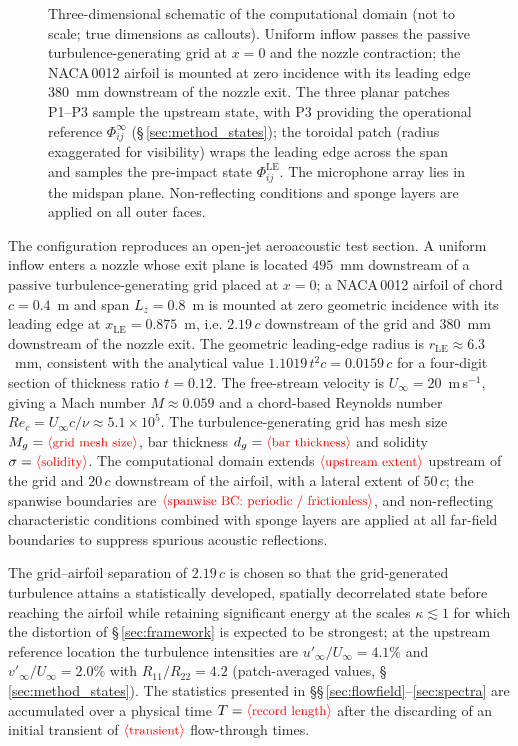 \documentclass[lineno]{JFM-FLM_Au}
\newcommand{\tbd}[1]{\textcolor{red}{\ensuremath{\langle\mbox{\small #1}\rangle}}}
\begin{document}
\begin{figure}
{\begin{tikzpicture}[>=Latex, font=\small, line join=round]
\end{tikzpicture}%
}
\caption{Three-dimensional schematic of the computational domain (not to
scale; true dimensions as callouts). Uniform inflow passes the passive
turbulence-generating grid at $x=0$ and the nozzle contraction; the
NACA\,0012 airfoil is mounted at zero incidence with its leading edge
$380$~mm downstream of the nozzle exit. The three planar patches P1--P3
sample the upstream state, with P3 providing the operational reference
$\Phi^{\infty}_{ij}$ (\S\,\ref{sec:method_states}); the toroidal patch
(radius exaggerated for visibility) wraps the leading edge across the
span and samples the pre-impact state $\Phi^{\mathrm{LE}}_{ij}$. The
microphone array lies in the midspan plane. Non-reflecting conditions
and sponge layers are applied on all outer faces.}
\label{fig:domain3d}
\end{figure}
The configuration reproduces an open-jet aeroacoustic test section. A
uniform inflow enters a nozzle whose exit plane is located $495$~mm
downstream of a passive turbulence-generating grid placed at $x = 0$; a
NACA\,0012 airfoil of chord $c = 0.4$~m and span $L_z = 0.8$~m is mounted
at zero geometric incidence with its leading edge at
$x_{\mathrm{LE}} = 0.875$~m, i.e. $2.19\,c$ downstream of the grid and
$380$~mm downstream of the nozzle exit. The geometric leading-edge radius
is $r_{\mathrm{LE}} \approx 6.3$~mm, consistent with the analytical value
$1.1019\,t^2 c = 0.0159\,c$ for a four-digit section of thickness ratio
$t = 0.12$. The free-stream velocity is $U_\infty = 20$~m\,s$^{-1}$,
giving a Mach number $M \approx 0.059$ and a chord-based Reynolds number
$Re_c = U_\infty c/\nu \approx 5.1\times10^{5}$.
The turbulence-generating grid has mesh size
$M_g = \tbd{grid mesh size}$, bar thickness $d_g = \tbd{bar thickness}$ and solidity
$\sigma = \tbd{solidity}$. The computational domain extends
$\tbd{upstream extent}$ upstream of the grid and $20\,c$ downstream of
the airfoil, with a lateral extent of $50\,c$; the spanwise boundaries
are $\tbd{spanwise BC: periodic / frictionless}$, and non-reflecting
characteristic conditions combined with sponge layers are applied at all
far-field boundaries to suppress spurious acoustic reflections.

The grid--airfoil separation of $2.19\,c$ is chosen so that the
grid-generated turbulence attains a statistically developed, spatially
decorrelated state before reaching the airfoil while retaining
significant energy at the scales $\kappa \lesssim 1$ for which the
distortion of \S\,\ref{sec:framework} is expected to be strongest; at the
upstream reference location the turbulence intensities are
$u'_\infty/U_\infty = 4.1\%$ and $v'_\infty/U_\infty = 2.0\%$ with
$R_{11}/R_{22} = 4.2$ (patch-averaged values, \S\,\ref{sec:method_states}).
The statistics presented in
\S\S\,\ref{sec:flowfield}--\ref{sec:spectra} are accumulated over a
physical time $T = \tbd{record length}$ after the discarding of an
initial transient of $\tbd{transient}$ flow-through times.
\end{document}
